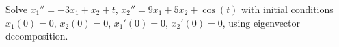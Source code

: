 \begin{exercise}
Solve
$x_1'' = -3x_1 + x_2 + t$, $x_2'' = 9x_1 + 5x_2
+\cos(t)$ with initial conditions
$x_1(0) = 0$, $x_2(0) = 0$,
$x_1'(0) = 0$, $x_2'(0) = 0$,
using eigenvector decomposition.
\end{exercise}

